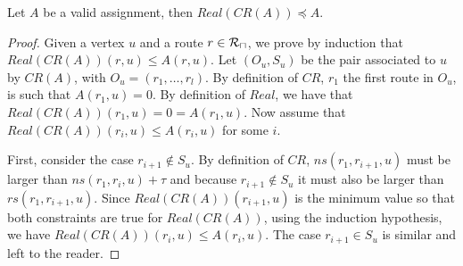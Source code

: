 \documentclass[english]{article}
\begin{document}
\begin{lemma}\label{lemma:prec}
Let $A$ be a valid assignment, then $Real(CR(A)) \preceq A$.
\end{lemma}
\begin{proof}
Given a vertex $u$ and a route $r \in \cal{R}_u$, we prove by induction that $Real(CR(A))(r,u) \leq A(r,u)$.
Let $(O_u,S_u)$ be the pair associated to $u$ by $CR(A)$, with $O_u = (r_1,\dots,r_l)$. By definition of $CR$, $r_1$ the first route in $O_u$, is such that $A(r_1,u) = 0$. By definition of $Real$, we have that  $Real(CR(A))(r_1,u) = 0 = A(r_1,u)$.
Now assume that $Real(CR(A))(r_i,u) \leq A(r_i,u)$ for some $i$. 

First, consider the case $r_{i+1} \notin S_u$. By definition of $CR$, $ns(r_1,r_{i+1},u)$ must be larger than 
$ns(r_1,r_{i},u)+ \tau$ and because $r_{i+1} \notin S_u$ it must also be larger than $rs(r_1,r_{i+1},u)$. 
Since $Real(CR(A))(r_{i+1},u)$ is the minimum value so that both constraints are true for $Real(CR(A))$, using
the induction hypothesis, we have $Real(CR(A))(r_i,u) \leq A(r_i,u)$. The case $r_{i+1} \in S_u$ is similar
and left to the reader.
\end{proof}


% 
% 
% 
% 
% 
\end{document}
